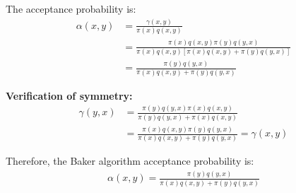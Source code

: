 The acceptance probability is:
\begin{align*}
\alpha(x,y) &= \frac{\gamma(x,y)}{\pi(x)q(x,y)}\\
&= \frac{\pi(x)q(x,y)\pi(y)q(y,x)}{\pi(x)q(x,y)[\pi(x)q(x,y) + \pi(y)q(y,x)]}\\
&= \frac{\pi(y)q(y,x)}{\pi(x)q(x,y) + \pi(y)q(y,x)}
\end{align*}

\textbf{Verification of symmetry:}
\begin{align*}
\gamma(y,x) &= \frac{\pi(y)q(y,x)\pi(x)q(x,y)}{\pi(y)q(y,x) + \pi(x)q(x,y)}\\
&= \frac{\pi(x)q(x,y)\pi(y)q(y,x)}{\pi(x)q(x,y) + \pi(y)q(y,x)} = \gamma(x,y)
\end{align*}

Therefore, the Baker algorithm acceptance probability is:
\begin{align*}
\alpha(x,y) = \frac{\pi(y)q(y,x)}{\pi(x)q(x,y) + \pi(y)q(y,x)}
\end{align*}
